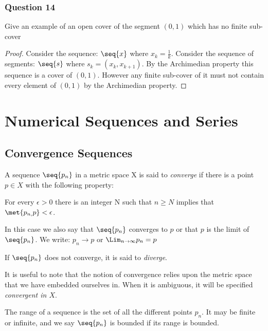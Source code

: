 \documentclass[12pt, letterpaper]{paper}
\begin{document}
\subsubsection{Question 14}
\label{sec:org36afe95}
\begin{question}
  Give an example of an open cover of the segment $(0,1)$ which has no
  finite sub-cover
\end{question}
\begin{proof}
  Consider the sequence: $\seq{x}$ where $x_k = \frac{1}{k}$. Consider
  the sequence of segments: $\seq{s}$ where $s_k = (x_k, x_{k+1})$. By
  the Archimedian property this sequence is a cover of
  $(0,1)$. However any finite sub-cover of it must not contain every
  element of $(0,1)$ by the Archimedian property.
\end{proof}


\section{Numerical Sequences and Series}
\label{sec:3}

\subsection{Convergence Sequences}
\label{sec:3.1}
A sequence $\seq{p_{n}}$ in a metric space X is said to
\emph{converge} if there is a point $p \in X$ with the following
property:

For every $\epsilon > 0$ there is an integer N such that $n \geq N$
implies that $\met{ p_{n, }p} < \epsilon$.

In this case we also say that $\seq{p_{n}}$ converges to $p$ or that
$p$ is the limit of $\seq{p_{n}}$. We write: $p_{n} \to p$ or
$\Lim_{n \to \infty} p_{n} = p$

If $\seq{p_{n}}$ does not converge, it is said to \emph{diverge}.

It is useful to note that the notion of convergence relies upon the
metric space that we have embedded ourselves in. When it is ambiguous,
it will be specified \emph{convergent in $X$}.

The range of a sequence is the set of all the different points
$p_{n}$. It may be finite or infinite, and we say $\seq{p_{n}}$ is
bounded if its range is bounded.
\end{document}

